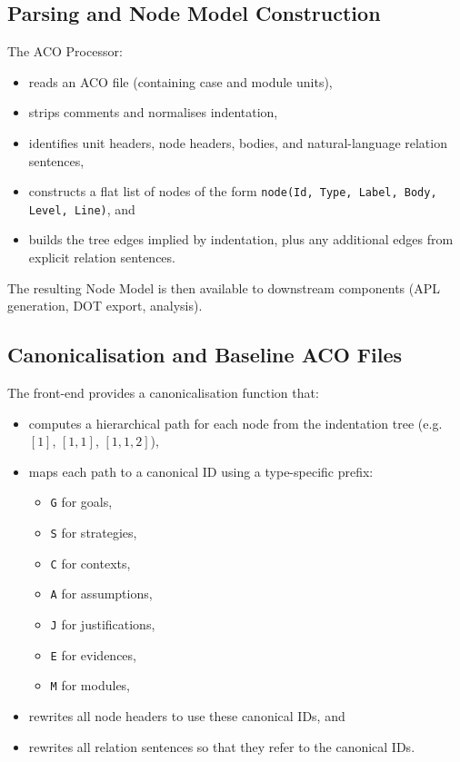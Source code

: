 \documentclass[11pt,twoside,a4paper]{article}
\begin{document}
\subsection{Parsing and Node Model Construction}

The ACO Processor:
\begin{itemize}[leftmargin=2em]
  \item reads an ACO file (containing case and module units),
  \item strips comments and normalises indentation,
  \item identifies unit headers, node headers, bodies, and natural-language relation sentences,
  \item constructs a flat list of nodes of the form
    \texttt{node(Id, Type, Label, Body, Level, Line)}, and
  \item builds the tree edges implied by indentation, plus any additional edges from explicit relation sentences.
\end{itemize}

The resulting Node Model is then available to downstream components (APL generation, DOT export, analysis).

\subsection{Canonicalisation and Baseline ACO Files}

The front-end provides a canonicalisation function that:
\begin{itemize}[leftmargin=2em]
  \item computes a hierarchical path for each node from the indentation tree (e.g.\ \([1]\), \([1,1]\), \([1,1,2]\)),
  \item maps each path to a canonical ID using a type-specific prefix:
    \begin{itemize}[leftmargin=1.5em]
      \item \texttt{G} for goals,
      \item \texttt{S} for strategies,
      \item \texttt{C} for contexts,
      \item \texttt{A} for assumptions,
      \item \texttt{J} for justifications,
      \item \texttt{E} for evidences,
      \item \texttt{M} for modules,
    \end{itemize}
  \item rewrites all node headers to use these canonical IDs, and
  \item rewrites all relation sentences so that they refer to the canonical IDs.
\end{itemize}
\end{document}
